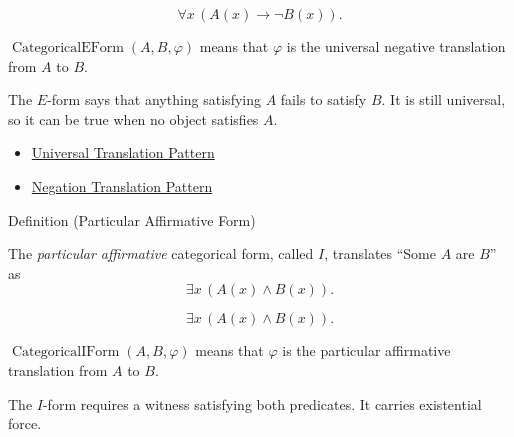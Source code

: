 \begin{remark*}
\[
\forall x\,(A(x)\to \neg B(x)).
\]
\end{remark*}

\begin{remark*}
\(\operatorname{CategoricalEForm}(A,B,\varphi)\) means that \(\varphi\) is the
universal negative translation from \(A\) to \(B\).
\end{remark*}

\begin{remark*}[Interpretation]
The \(E\)-form says that anything satisfying \(A\) fails to satisfy \(B\). It
is still universal, so it can be true when no object satisfies \(A\).
\end{remark*}

\begin{dependencies}
\begin{itemize}
  \item \hyperref[prop:universal-translation-pattern]{Universal Translation Pattern}
  \item \hyperref[prop:negation-translation-pattern]{Negation Translation Pattern}
\end{itemize}
\end{dependencies}

\begin{definitionbox}{Definition (Particular Affirmative Form)}
\begin{definition}
\label{def:categorical-i-form-predicate-logic}
The \emph{particular affirmative} categorical form, called \(I\), translates
``Some \(A\) are \(B\)'' as
\[
\exists x\,(A(x)\land B(x)).
\]
\end{definition}
\end{definitionbox}

\begin{remark*}
\[
\exists x\,(A(x)\land B(x)).
\]
\end{remark*}

\begin{remark*}
\(\operatorname{CategoricalIForm}(A,B,\varphi)\) means that \(\varphi\) is the
particular affirmative translation from \(A\) to \(B\).
\end{remark*}

\begin{remark*}[Interpretation]
The \(I\)-form requires a witness satisfying both predicates. It carries
existential force.
\end{remark*}

